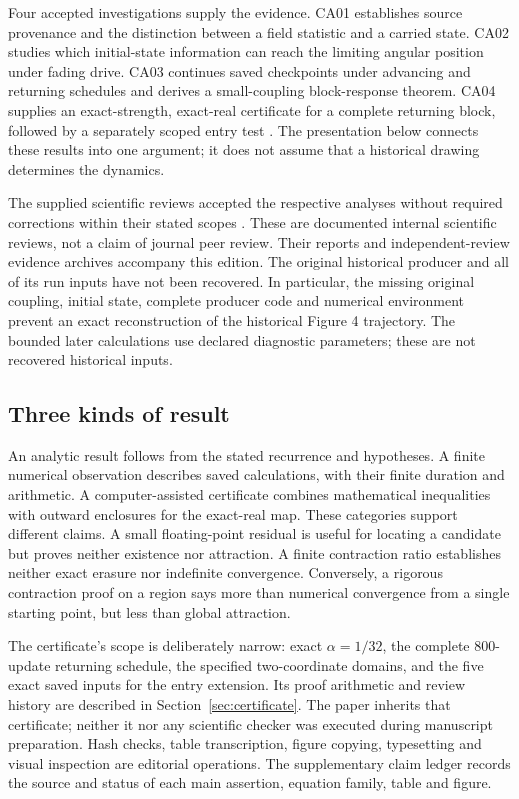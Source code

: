 \documentclass[11pt,a4paper]{article}
\numberwithin{equation}{section}
\begin{document}
Four accepted investigations supply the evidence. CA01 establishes source provenance and the distinction between a field statistic and a carried state. CA02 studies which initial-state information can reach the limiting angular position under fading drive. CA03 continues saved checkpoints under advancing and returning schedules and derives a small-coupling block-response theorem. CA04 supplies an exact-strength, exact-real certificate for a complete returning block, followed by a separately scoped entry test \cite{ca01,ca02,ca03,ca04}. The presentation below connects these results into one argument; it does not assume that a historical drawing determines the dynamics.

The supplied scientific reviews accepted the respective analyses without required corrections within their stated scopes \cite{review01,review02,review03,review04}. These are documented internal scientific reviews, not a claim of journal peer review. Their reports and independent-review evidence archives accompany this edition. The original historical producer and all of its run inputs have not been recovered. In particular, the missing original coupling, initial state, complete producer code and numerical environment prevent an exact reconstruction of the historical Figure 4 trajectory. The bounded later calculations use declared diagnostic parameters; these are not recovered historical inputs.

\subsection{Three kinds of result}
An analytic result follows from the stated recurrence and hypotheses. A finite numerical observation describes saved calculations, with their finite duration and arithmetic. A computer-assisted certificate combines mathematical inequalities with outward enclosures for the exact-real map. These categories support different claims. A small floating-point residual is useful for locating a candidate but proves neither existence nor attraction. A finite contraction ratio establishes neither exact erasure nor indefinite convergence. Conversely, a rigorous contraction proof on a region says more than numerical convergence from a single starting point, but less than global attraction.

The certificate's scope is deliberately narrow: exact $\alpha=1/32$, the complete 800-update returning schedule, the specified two-coordinate domains, and the five exact saved inputs for the entry extension. Its proof arithmetic and review history are described in Section~\ref{sec:certificate}. The paper inherits that certificate; neither it nor any scientific checker was executed during manuscript preparation. Hash checks, table transcription, figure copying, typesetting and visual inspection are editorial operations. The supplementary claim ledger records the source and status of each main assertion, equation family, table and figure.
\end{document}

